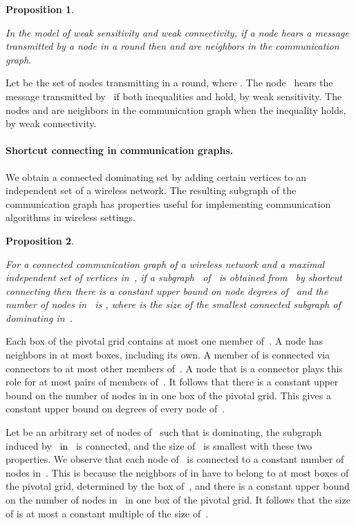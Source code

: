 \documentclass[11pt]{article}
\newcommand{\BBB}{\vspace*{-\bigskipamount}}
\newcommand{\Paragraph}[1]{\BBB\paragraph{#1}}
\newcommand{\qed}{\hfill  \smallskip}
\newenvironment{proof}{\noindent{\bf Proof:}}{\qed}
\newtheorem{proposition}{Proposition}
\begin{document}
\begin{proposition}
\label{prop:hearing-only-from-neighbors}

In the model of weak sensitivity and weak connectivity, if a node  hears a message transmitted by a node  in a round then  and  are neighbors in the communication graph.
\end{proposition}

\begin{proof}
Let  be the set of nodes transmitting in a round, where .
The node~ hears the message transmitted by~ if both inequalities 
 and  hold, by weak sensitivity.
The nodes  and  are neighbors in the communication graph when the inequality  holds, by weak connectivity.
\end{proof}



\Paragraph{Shortcut connecting in communication graphs.}


We obtain a connected dominating set by adding certain vertices to an independent set of a wireless network.
The resulting subgraph of the communication graph has properties useful for implementing communication algorithms in wireless settings.




\begin{proposition}
\label{pro:shortcut-connecting-communication-graphs}

For a connected communication graph  of a wireless network and a maximal independent set of vertices  in~, if a subgraph~ of~ is obtained from~ by shortcut connecting then there is a constant upper bound on node degrees of~ and the number of nodes in~ is , where  is the size of the smallest connected  subgraph of~ dominating in~.
\end{proposition}

\begin{proof}
Each box of the pivotal grid contains at most one member of~.
A node has neighbors in at most  boxes, including its own.
A member of  is connected via connectors to at most  other members of~.
A node that is a connector plays this role for at most  pairs of members of~.
It follows that there is a constant upper bound on the number of nodes in  in one box of the pivotal grid.
This gives a constant upper bound on degrees of every node of~.

Let  be an arbitrary set of  nodes of~ such that  is dominating, the subgraph induced by~ in~ is connected, and the size  of~ is smallest with these two properties.
We observe that each node  of~ is connected to a constant number of nodes in~. This is because the neighbors of  in  have to belong to at most  boxes  of the pivotal grid, determined by the box of~, and there is a constant upper bound on the number of nodes in~ in one box of the pivotal grid.
It follows that the size of  is at most a constant multiple of the size of~.
\end{proof}
\end{document}
